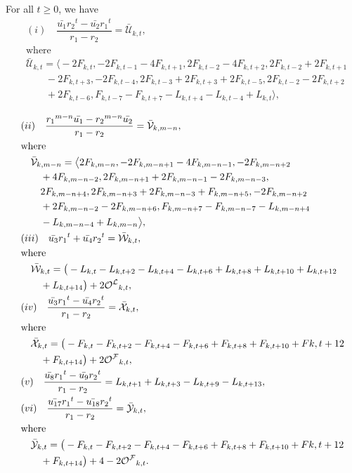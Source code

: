 \begin{lemma}\label{2.8l}
For all $t\geq{0}$, we have 
\begin{align*}
&(i)\quad\dfrac{\bar{u_1}{r_2}^{t}-\bar{u_2}{r_1}^{t}}{r_1-r_2}=\bar{\mathcal{U}}_{k,t},\\
&\text{where}\\
&\bar{\mathcal{U}}_{k,t}=\big\langle -2F_{k,t}, -2F_{k,t-1}-4F_{k,t+1}, 2F_{k,t-2}-4F_{k,t+2},2F_{k,t-2}+2F_{k,t+1}\\&\qquad-2F_{k,t+3}, -2F_{k,t-4}, 2F_{k,t-3}+2F_{k,t+3}+2F_{k,t-5}, 2F_{k,t-2}-2F_{k,t+2}\\&\qquad+2F_{k,t-6}, F_{k,t-7}-F_{k,t+7}-L_{k,t+4}-L_{k,t-4}+L_{k,t}\big\rangle,\\
\end{align*}
\begin{align*}
&(ii)\quad \dfrac{{r_1}^{m-n}\bar{u_1}-{r_2}^{m-n}\bar{u_2}}{r_1-r_2}= \bar{\mathcal{V}}_{k,m-n},\\
&\text{where}\\
&\quad \bar{\mathcal{V}}_{k,m-n}=\big\langle 2F_{k,{m-n}}, -2F_{k,{m-n}+1}-4F_{k,{m-n}-1}, -2F_{k,{m-n}+2}\\&\qquad+4F_{k,{m-n}-2}, 2F_{k,{m-n}+1}+2F_{k,{m-n}-1}-2F_{k,{m-n}-3},\\&\qquad 2F_{k,{m-n}+4}, 2F_{k,{m-n}+3}+2F_{k,{m-n}-3}+F_{k,{m-n}+5}, -2F_{k,{m-n}+2}\\&\qquad+2F_{k,{m-n}-2}-2F_{k,{m-n}+6}, F_{k,{m-n}+7}-F_{k,{m-n}-7}-L_{k,{m-n}+4}\\&\qquad-L_{k,{m-n}-4}+L_{k,{m-n}}\big\rangle,\\
&(iii)\quad \bar{u_3}{r_1}^{t}+\bar{u_4}{r_2}^{t}=\bar{\mathcal{W}}_{k,t},\\
&\text{where}\\
&\quad \bar{\mathcal{W}}_{k,t}=\big(-L_{k,t}-L_{k,t+2}-L_{k,t+4}-L_{k,t+6}+L_{k,t+8} +L_{k,t+10}+L_{k,t+12}\\&\qquad+L_{k,t+14}\big)+2{{\mathcal{O^L}}}_{k,t},\\
&(iv)\quad \frac{\bar{u_3}{r_1}^{t}-\bar{u_4}{r_2}^{t}}{r_1-r_2}=\bar{\mathcal{X}}_{k,t},\\
&\text{where}\\
&\quad \bar{\mathcal{X}}_{k,t}=\big( -F_{k,t}-F_{k,t+2}-F_{k,t+4}-F_{k,t+6}+F_{k,t+8} +F_{k,t+10}+F{k,t+12}\\&\qquad+F_{k,t+14}\big)+2{{\mathcal{O^F}}}_{k,t},\\
&(v)\quad \frac{\bar{u_8}{r_1}^{t}-\bar{u_9}{r_2}^{t}}{r_1-r_2}=L_{k,t+1}+L_{k,t+3}-L_{k,t+9}-L_{k,t+13},\\
&(vi)\quad \frac{\bar{u_{17}}{r_1}^{t}-\bar{u_{18}}{r_2}^{t}}{r_1-r_2}=\bar{\mathcal{Y}}_{k,t},\\
&\text{where}\\
&\quad \bar{\mathcal{Y}}_{k,t}=\big( -F_{k,t}-F_{k,t+2}-F_{k,t+4}-F_{k,t+6}+F_{k,t+8} +F_{k,t+10}+F{k,t+12}\\&\qquad+F_{k,t+14}\big)+4-2{{\mathcal{O^F}}}_{k,t}.
\end{align*}
\end{lemma}
